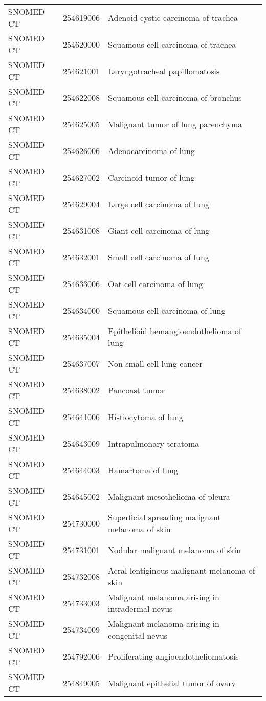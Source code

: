 \begin{longtable}{p{}p{}p{}}
  SNOMED CT & 254619006 & Adenoid cystic carcinoma of trachea \\ 
  SNOMED CT & 254620000 & Squamous cell carcinoma of trachea \\ 
  SNOMED CT & 254621001 & Laryngotracheal papillomatosis \\ 
  SNOMED CT & 254622008 & Squamous cell carcinoma of bronchus \\ 
  SNOMED CT & 254625005 & Malignant tumor of lung parenchyma \\ 
  SNOMED CT & 254626006 & Adenocarcinoma of lung \\ 
  SNOMED CT & 254627002 & Carcinoid tumor of lung \\ 
  SNOMED CT & 254629004 & Large cell carcinoma of lung \\ 
  SNOMED CT & 254631008 & Giant cell carcinoma of lung \\ 
  SNOMED CT & 254632001 & Small cell carcinoma of lung \\ 
  SNOMED CT & 254633006 & Oat cell carcinoma of lung \\ 
  SNOMED CT & 254634000 & Squamous cell carcinoma of lung \\ 
  SNOMED CT & 254635004 & Epithelioid hemangioendothelioma of lung \\ 
  SNOMED CT & 254637007 & Non-small cell lung cancer \\ 
  SNOMED CT & 254638002 & Pancoast tumor \\ 
  SNOMED CT & 254641006 & Histiocytoma of lung \\ 
  SNOMED CT & 254643009 & Intrapulmonary teratoma \\ 
  SNOMED CT & 254644003 & Hamartoma of lung \\ 
  SNOMED CT & 254645002 & Malignant mesothelioma of pleura \\ 
  SNOMED CT & 254730000 & Superficial spreading malignant melanoma of skin \\ 
  SNOMED CT & 254731001 & Nodular malignant melanoma of skin \\ 
  SNOMED CT & 254732008 & Acral lentiginous malignant melanoma of skin \\ 
  SNOMED CT & 254733003 & Malignant melanoma arising in intradermal nevus \\ 
  SNOMED CT & 254734009 & Malignant melanoma arising in congenital nevus \\ 
  SNOMED CT & 254792006 & Proliferating angioendotheliomatosis \\ 
  SNOMED CT & 254849005 & Malignant epithelial tumor of ovary \\ 

\end{longtable}
